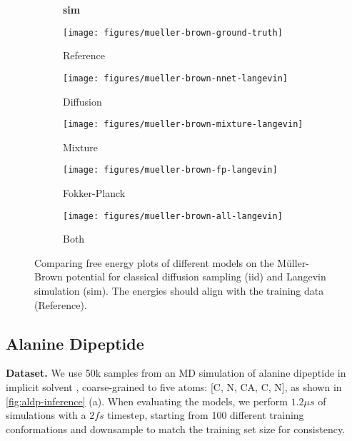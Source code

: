 \begin{figure}
    \begin{minipage}{\textwidth}
        \begin{subfigure}[c]{0.1\textwidth}
            \vspace{-0.5cm}
            \textbf{sim}
        \end{subfigure}
        \begin{subfigure}[c]{0.17\textwidth}
            \centering
            \texttt{[image: figures/mueller-brown-ground-truth]}
            \caption*{Reference}
        \end{subfigure}
        \begin{subfigure}[c]{0.17\textwidth}
            \centering
            \texttt{[image: figures/mueller-brown-nnet-langevin]}
            \caption*{Diffusion}
        \end{subfigure}
        \begin{subfigure}[c]{0.17\textwidth}
            \centering
            \texttt{[image: figures/mueller-brown-mixture-langevin]}
            \caption*{Mixture}
        \end{subfigure}
        \begin{subfigure}[c]{0.17\textwidth}
            \centering
            \texttt{[image: figures/mueller-brown-fp-langevin]}
            \caption*{Fokker-Planck}
        \end{subfigure}
        \begin{subfigure}[c]{0.17\textwidth}
            \centering
            \texttt{[image: figures/mueller-brown-all-langevin]}
            \caption*{Both}
        \end{subfigure}
    \end{minipage}
    \caption{Comparing free energy plots of different models on the Müller-Brown potential for classical diffusion sampling (iid) and Langevin simulation (sim). The energies should align with the training data (Reference).}
    \label{fig:mueller-brown}
    \vspace{-0.1cm}
\end{figure}


\subsection{Alanine Dipeptide}
\textbf{Dataset.} We use 50k samples from an MD simulation of alanine dipeptide in implicit solvent \citep{kohler2021smooth}, coarse-grained to five atoms: [C, N, CA, C, N], as shown in \cref{fig:aldp-inference} (a). When evaluating the models, we perform $1.2\mu s$ of simulations with a $2fs$ timestep, starting from 100 different training conformations and downsample to match the training set size for consistency.

